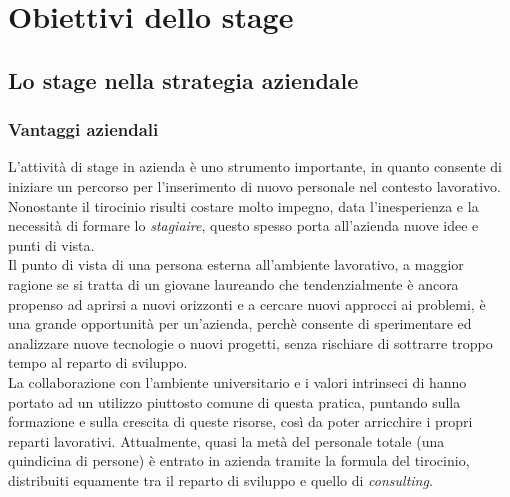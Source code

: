 
\cleardoublepage
\chapter{Obiettivi dello stage}
\label{cap:obiettivi-stage}
\section{Lo stage nella strategia aziendale}
\subsection{Vantaggi aziendali}
L'attività di stage in azienda è uno strumento importante, in quanto consente di iniziare un percorso per l'inserimento di nuovo personale nel contesto lavorativo.\\
Nonostante il tirocinio risulti costare molto impegno, data l'inesperienza e la necessità di formare lo \textit{stagiaire}, questo spesso porta all'azienda nuove idee e punti di vista.\\
Il punto di vista di una persona esterna all'ambiente lavorativo, a maggior ragione se si tratta di un giovane laureando che tendenzialmente è ancora propenso ad aprirsi a nuovi orizzonti e a cercare nuovi approcci ai problemi, è una grande opportunità per un'azienda, perchè consente di sperimentare ed analizzare nuove tecnologie o nuovi progetti, senza rischiare di sottrarre troppo tempo al reparto di sviluppo.\\
La collaborazione con l'ambiente universitario e i valori intrinseci di \AD{} hanno portato ad un utilizzo piuttosto comune di questa pratica, puntando sulla formazione e sulla crescita di queste risorse, così da poter arricchire i propri reparti lavorativi. Attualmente, quasi la metà del personale totale (una quindicina di persone) è entrato in azienda tramite la formula del tirocinio, distribuiti equamente tra il reparto di sviluppo e quello di \textit{consulting}.

